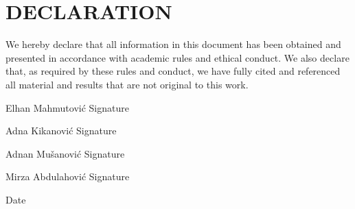 \chapter*{DECLARATION}

We hereby declare that all information in this document has been obtained and presented in accordance with academic rules and ethical conduct. We also declare that, as required by these rules and conduct, we have fully cited and referenced all material and results that are not original to this work.

\vspace{1.5cm}

\newcommand{\SigRow}[1]{%
  \noindent #1 \hfill Signature \makebox[6cm][l]{\dotfill}\par
  \vspace{1.2cm}%
}

\SigRow{Elhan Mahmutovi\'{c}}
\SigRow{Adna Kikanovi\'{c}}
\SigRow{Adnan Mu\v{s}anovi\'{c}}
\SigRow{Mirza Abdulahovi\'{c}}

\vspace{0.5cm}
\hfill Date \makebox[4cm][l]{\dotfill}

\vspace{2cm}
\begin{center}\MakeUppercase{\InstitutionName}\end{center}

\clearpage
